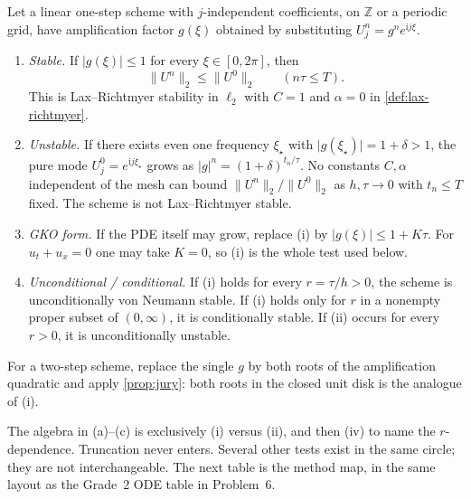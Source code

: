 \documentclass[11pt,a4paper]{article}
\begin{document}
\begin{theorem}
\label{thm:vn-decide}
Let a linear one-step scheme with \(j\)-independent coefficients, on \(\mathbb Z\) or a periodic grid, have amplification factor \(g(\xi)\) obtained by substituting \(U_j^n=g^n e^{\mathrm i j\xi}\).
\begin{enumerate}[label=\textup{(\roman*)}]
    \item \emph{Stable.} If \(\lvert g(\xi)\rvert\le 1\) for every \(\xi\in[0,2\pi]\), then
    \[
    \|U^n\|_2
    \le
    \|U^0\|_2
    \qquad
    (n\tau\le T).
    \]
    This is Lax--Richtmyer stability in \(\ell_2\) with \(C=1\) and \(\alpha=0\) in \cref{def:lax-richtmyer}.
    \item \emph{Unstable.} If there exists even one frequency \(\xi_\star\) with \(\lvert g(\xi_\star)\rvert=1+\delta>1\), the pure mode \(U_j^0=e^{\mathrm i j\xi_\star}\) grows as \(\lvert g\rvert^n=(1+\delta)^{t_n/\tau}\). No constants \(C,\alpha\) independent of the mesh can bound \(\|U^n\|_2/\|U^0\|_2\) as \(h,\tau\to 0\) with \(t_n\le T\) fixed. The scheme is not Lax--Richtmyer stable.
    \item \emph{GKO form.} If the PDE itself may grow, replace (i) by \(\lvert g(\xi)\rvert\le 1+K\tau\). For \(u_t+u_x=0\) one may take \(K=0\), so (i) is the whole test used below.
    \item \emph{Unconditional / conditional.} If (i) holds for every \(r=\tau/h>0\), the scheme is unconditionally von Neumann stable. If (i) holds only for \(r\) in a nonempty proper subset of \((0,\infty)\), it is conditionally stable. If (ii) occurs for every \(r>0\), it is unconditionally unstable.
\end{enumerate}
For a two-step scheme, replace the single \(g\) by both roots of the amplification quadratic and apply \cref{prop:jury}: both roots in the closed unit disk is the analogue of (i).
\end{theorem}

The algebra in (a)--(c) is exclusively (i) versus (ii), and then (iv) to name the \(r\)-dependence. Truncation never enters. Several other tests exist in the same circle; they are not interchangeable. The next table is the method map, in the same layout as the Grade~2 ODE table in Problem~6.
\end{document}
